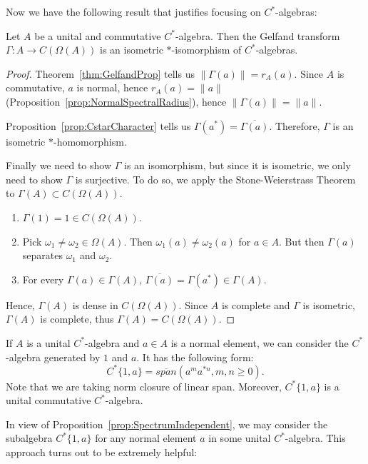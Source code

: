 Now we have the following result that justifies focusing on $C^*$-algebras:

\begin{theorem}
	\label{thm:GelfandIsomorphism}
	Let $A $ be a unital and commutative $C^*$-algebra. Then the Gelfand transform $\Gamma: A \to C(\Omega(A))$ is an isometric $*$-isomorphism of $C^*$-algebras.
\end{theorem}
\begin{proof}
	Theorem~\ref{thm:GelfandProp} tells us $\|\Gamma(a)\| = r_A(a)$. Since $A$ is commutative, $a$ is normal, hence $r_A(a) = \|a\|$ (Proposition~\ref{prop:NormalSpectralRadius}), hence $\|\Gamma(a)\| = \|a\|$.

	Proposition~\ref{prop:CstarCharacter} tells us $\Gamma(a^*) = \overline{\Gamma(a)} $. Therefore, $\Gamma$ is an isometric $*$-homomorphism.

	Finally we need to show $\Gamma$ is an isomorphism, but since it is isometric, we only need to show $\Gamma$ is surjective. To do so, we apply the Stone-Weierstrass Theorem to $\Gamma(A) \subset C(\Omega(A))$.
	\begin{enumerate}
		\item $\Gamma(1) = 1 \in C(\Omega(A))$.
		\item Pick $\omega_1 \neq \omega_2 \in \Omega(A)$. Then $\omega_1(a) \neq \omega_2(a)$ for $a \in A$. But then $\Gamma(a)$ separates $\omega_1$ and $\omega_2$.
		\item For every $\Gamma(a) \in \Gamma(A)$, $\overline{\Gamma(a)}  = \Gamma(a^*) \in \Gamma(A)$.
	\end{enumerate}
	Hence, $\Gamma(A)$ is dense in $C(\Omega(A))$. Since $A$ is complete and $\Gamma$ is isometric, $\Gamma(A)$ is complete, thus $\Gamma(A) = C(\Omega(A))$.
\end{proof}

If $A$ is a unital $C^*$-algebra and $a \in A$ is a normal element, we can consider the $C^*$-algebra generated by $1$ and $a$. It has the following form:
\[
	C^* \{1, a\}  = \overline{span}\left( a^m a^{* n}, m, n \ge 0 \right)  
.\] 
Note that we are taking norm closure of linear span. Moreover, $C^* \{1, a\} $ is a unital commutative $C^*$-algebra.

In view of Proposition~\ref{prop:SpectrumIndependent}, we may consider the subalgebra $C^* \{1, a\} $ for any normal element $a$ in some unital $C^*$-algebra. This approach turns out to be extremely helpful:

